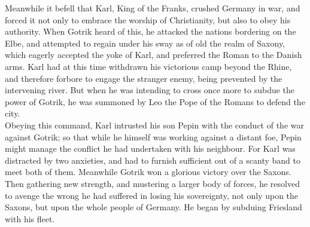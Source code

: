 \documentclass[10pt,a4paper]{report}
\begin{document}
Meanwhile it befell that Karl, King of the Franks, crushed Germany in war, and forced it not only to embrace the worship of Christianity, but also to obey his authority. When Gotrik heard of this, he attacked the nations bordering on the Elbe, and attempted to regain under his sway as of old the realm of Saxony, which eagerly accepted the yoke of Karl, and preferred the Roman to the Danish arms. Karl had at this time withdrawn his victorious camp beyond the Rhine, and therefore forbore to engage the stranger enemy, being prevented by the intervening river. But when he was intending to cross once more to subdue the power of Gotrik, he was summoned by Leo the Pope of the Romans to defend the city.\\

Obeying this command, Karl intrusted his son Pepin with the conduct of the war against Gotrik; so that while he himself was working against a distant foe, Pepin might manage the conflict he had undertaken with his neighbour. For Karl was distracted by two anxieties, and had to furnish sufficient out of a scanty band to meet both of them. Meanwhile Gotrik won a glorious victory over the Saxons. Then gathering new strength, and mustering a larger body of forces, he resolved to avenge the wrong he had suffered in losing his sovereignty, not only upon the Saxons, but upon the whole people of Germany. He began by subduing Friesland with his fleet.\\
\end{document}
